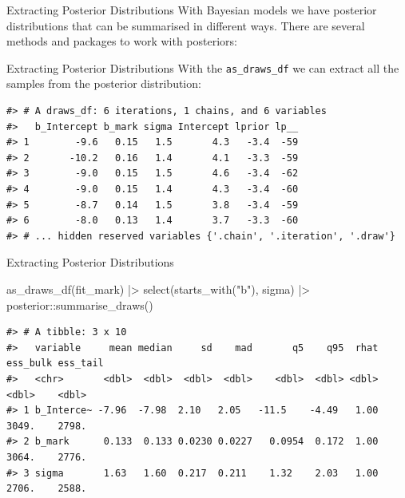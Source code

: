 \documentclass[
  ignorenonframetext,
]{beamer}
\newenvironment{Shaded}{\begin{snugshade}}{\end{snugshade}}
\newcommand{\FunctionTok}[1]{\textcolor[rgb]{0.28,0.35,0.67}{#1}}
\newcommand{\NormalTok}[1]{\textcolor[rgb]{0.00,0.23,0.31}{#1}}
\newcommand{\SpecialCharTok}[1]{\textcolor[rgb]{0.37,0.37,0.37}{#1}}
\newcommand{\StringTok}[1]{\textcolor[rgb]{0.13,0.47,0.30}{#1}}
\begin{document}
\begin{frame}{Extracting Posterior Distributions}
\label{extracting-posterior-distributions-1}
With Bayesian models we have posterior distributions that can be
summarised in different ways. There are several methods and packages to
work with posteriors:
\end{frame}

\begin{frame}[fragile]{Extracting Posterior Distributions}
\label{extracting-posterior-distributions-2}
With the \texttt{as\_draws\_df} we can extract all the samples from the
posterior distribution:

\begin{verbatim}
#> # A draws_df: 6 iterations, 1 chains, and 6 variables
#>   b_Intercept b_mark sigma Intercept lprior lp__
#> 1        -9.6   0.15   1.5       4.3   -3.4  -59
#> 2       -10.2   0.16   1.4       4.1   -3.3  -59
#> 3        -9.0   0.15   1.5       4.6   -3.4  -62
#> 4        -9.0   0.15   1.4       4.3   -3.4  -60
#> 5        -8.7   0.14   1.5       3.8   -3.4  -59
#> 6        -8.0   0.13   1.4       3.7   -3.3  -60
#> # ... hidden reserved variables {'.chain', '.iteration', '.draw'}
\end{verbatim}
\end{frame}

\begin{frame}[fragile]{Extracting Posterior Distributions}
\label{extracting-posterior-distributions-3}
\begin{Shaded}
\begin{Highlighting}[]
\FunctionTok{as\_draws\_df}\NormalTok{(fit\_mark) }\SpecialCharTok{|\textgreater{}} 
  \FunctionTok{select}\NormalTok{(}\FunctionTok{starts\_with}\NormalTok{(}\StringTok{"b"}\NormalTok{), sigma) }\SpecialCharTok{|\textgreater{}} 
\NormalTok{  posterior}\SpecialCharTok{::}\FunctionTok{summarise\_draws}\NormalTok{()}
\end{Highlighting}
\end{Shaded}

\begin{verbatim}
#> # A tibble: 3 x 10
#>   variable     mean median     sd    mad       q5    q95  rhat ess_bulk ess_tail
#>   <chr>       <dbl>  <dbl>  <dbl>  <dbl>    <dbl>  <dbl> <dbl>    <dbl>    <dbl>
#> 1 b_Interce~ -7.96  -7.98  2.10   2.05   -11.5    -4.49   1.00    3049.    2798.
#> 2 b_mark      0.133  0.133 0.0230 0.0227   0.0954  0.172  1.00    3064.    2776.
#> 3 sigma       1.63   1.60  0.217  0.211    1.32    2.03   1.00    2706.    2588.
\end{verbatim}
\end{frame}
\end{document}
